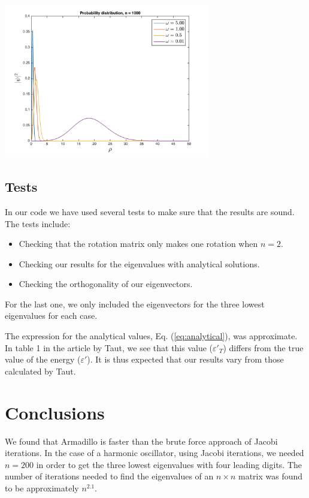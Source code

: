 \documentclass{article}
\begin{document}
\begin{multicols}{2}
\begin{center}
	\includegraphics[width=90mm]{../build-Project2-Desktop_Qt_5_5_0_clang_64bit-Debug/probability_distribution.png} 	
	\label{fig:prob_dist}
\end{center}


\subsection{Tests}
In our code we have used several tests to make sure that the results are sound. The tests include:

\begin{itemize}
	\item Checking that the rotation matrix only makes one rotation when $n = 2$.
	\item Checking our results for the eigenvalues with analytical solutions.
	\item Checking the orthogonality of our eigenvectors.
\end{itemize}
For the last one, we only included the eigenvectors for the three lowest eigenvalues for each case.

The expression for the analytical values, Eq. (\ref{eq:analytical}), was approximate. In table 1 in the article by Taut, we see that this value ($\varepsilon'_T$) differs from the true value of the energy ($\varepsilon'$). It is thus expected that our results vary from those calculated by Taut.


\section{Conclusions}
We found that Armadillo is faster than the brute force approach of Jacobi iterations.
In the case of a harmonic oscillator, using Jacobi iterations, we needed $n=200$ in order to get the three lowest eigenvalues with four leading digits. The number of iterations needed to find the eigenvalues of an $n\times n$ matrix was found to be approximately $n^{2.1}$.


\end{multicols}
\end{document}
